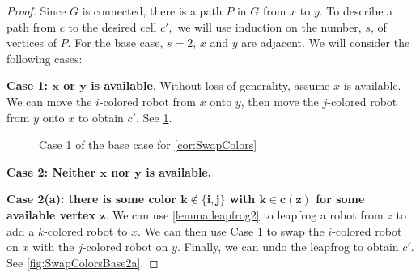 \documentclass{amsart}
\newcommand{\Sr}{S_{\vec{r}}}
\newcommand{\vertex}[3][1]{
\node [circle,  fill, inner sep = 0pt,outer sep = 0pt, minimum size=#1mm] (#3) at #2 {};
}
\newcommand{\fg}[1]{
    \pgfdeclarelayer{foreground}
    \pgfsetlayers{main,foreground}
    \begin{pgfonlayer}{foreground}
    #1
    \end{pgfonlayer}
    }
\newcommand{\RedRobot}[2]{
\node [rectangle, cbred, fill, inner sep = 0pt,outer sep = 1pt, minimum size=2.3mm] (#2) at #1 {};
}
\newcommand{\GreenRobot}[2]{
\node [diamond, cbgreen, fill, inner sep = 0pt,outer sep = 1pt,minimum size=3mm] (#2) at #1 {};
}
\newcommand{\BlueRobot}[2]{
\node [isosceles triangle, shape border rotate=90,cbblue, fill, inner sep = 0pt,outer sep = 1pt,minimum size=2.5mm] (#2) at #1 {};
}
\newtheorem{cor}[thm]{Corollary}
\theoremstyle{definition}
\theoremstyle{remark}
\begin{document}

\begin{proof}
Since $G$ is connected, there is a path $P$ in $G$ from $x$ to $y$. To describe a path from $c$ to the desired cell $c',$ we will use induction on the number, $s$, of vertices of $P$. For the base case, $s=2$, $x$ and $y$ are adjacent. We will consider the following cases:

\textbf{Case 1: $\boldsymbol{x}$ or $\boldsymbol{y}$ is available}. Without loss of generality, assume $x$ is available. We can move the $i$-colored robot from $x$ onto $y$, then move the $j$-colored robot from $y$ onto $x$ to obtain $c'$. See \cref{fig:SwapColorsBase1}.

\begin{figure}[h!]
    \centering
      \quad
    \caption{Case 1 of the base case for \cref{cor:SwapColors}}
    \label{fig:SwapColorsBase1}
\end{figure}

\textbf{Case 2: Neither $\boldsymbol{x}$ nor $\boldsymbol{y}$ is available.}

\quad\textbf{Case 2(a): there is some color $\boldsymbol{k\notin\{i,j\}}$ with $\boldsymbol{k\in c(z)}$ for some available vertex $\boldsymbol{z}$}.  We can use  \cref{lemma:leapfrog2} to leapfrog a robot from $z$ to add a $k$-colored robot to $x$. We can then use Case 1 to swap the $i$-colored robot on $x$ with the $j$-colored robot on $y$. Finally, we can undo the leapfrog to obtain $c'$. See \cref{fig:SwapColorsBase2a}.


\end{proof}
\end{document}
